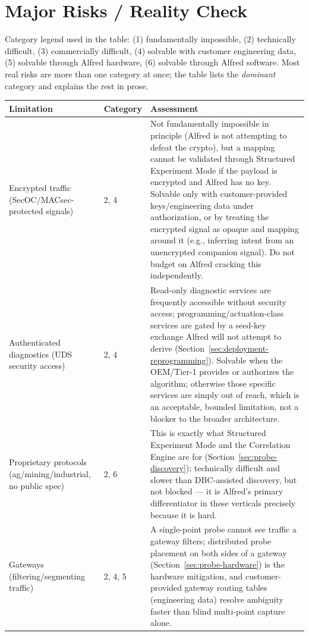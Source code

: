 \section{Major Risks / Reality Check}
\label{sec:risks}

Category legend used in the table: (1) fundamentally impossible, (2) technically difficult, (3) commercially difficult, (4) solvable with customer engineering data, (5) solvable through Alfred hardware, (6) solvable through Alfred software. Most real risks are more than one category at once; the table lists the \emph{dominant} category and explains the rest in prose.

\begin{center}
\small
\begin{longtable}{@{}p{2.4cm} p{1.7cm} p{11.2cm}@{}}
\toprule
\textbf{Limitation} & \textbf{Category} & \textbf{Assessment} \\
\midrule
\endhead
Encrypted traffic (SecOC/MACsec-protected signals) & 2, 4 & Not fundamentally impossible in principle (Alfred is not attempting to defeat the crypto), but a mapping cannot be validated through Structured Experiment Mode if the payload is encrypted and Alfred has no key. Solvable only with customer-provided keys/engineering data under authorization, or by treating the encrypted signal as opaque and mapping around it (e.g., inferring intent from an unencrypted companion signal). Do not budget on Alfred cracking this independently. \\
Authenticated diagnostics (UDS security access) & 2, 4 & Read-only diagnostic services are frequently accessible without security access; programming/actuation-class services are gated by a seed-key exchange Alfred will not attempt to derive (Section~\ref{sec:deployment-reprogramming}). Solvable when the OEM/Tier-1 provides or authorizes the algorithm; otherwise those specific services are simply out of reach, which is an acceptable, bounded limitation, not a blocker to the broader architecture. \\
Proprietary protocols (ag/mining/industrial, no public spec) & 2, 6 & This is exactly what Structured Experiment Mode and the Correlation Engine are for (Section~\ref{sec:probe-discovery}); technically difficult and slower than DBC-assisted discovery, but not blocked --- it is Alfred's primary differentiator in these verticals precisely because it is hard. \\
Gateways (filtering/segmenting traffic) & 2, 4, 5 & A single-point probe cannot see traffic a gateway filters; distributed probe placement on both sides of a gateway (Section~\ref{sec:probe-hardware}) is the hardware mitigation, and customer-provided gateway routing tables (engineering data) resolve ambiguity faster than blind multi-point capture alone. \\

\end{longtable}
\end{center}
